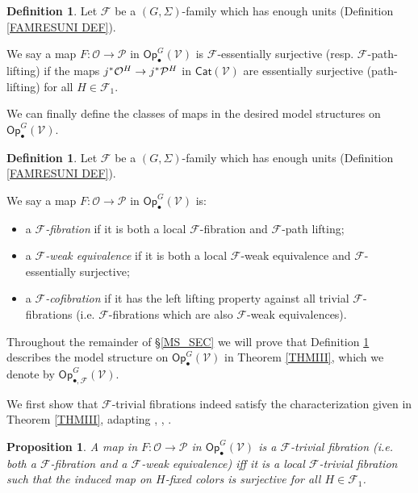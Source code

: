 \documentclass[a4paper,10pt
,draft
]{article}%
\numberwithin{equation}{section}
\numberwithin{figure}{section}
\newtheorem{proposition}[equation]{Proposition}%
\theoremstyle{definition} %
\newtheorem{definition}[equation]{Definition}%
\newcommand{\F}{\ensuremath{\mathcal F}}
\newcommand{\V}{\ensuremath{\mathcal V}}
\renewcommand{\O}{\ensuremath{\mathcal O}}
\renewcommand{\P}{\ensuremath{\mathcal P}}
\newcommand{\1}{\ensuremath{\mathbbm 1}}%
\begin{document}
\begin{definition}\label{FESSENSURJ DEF}
Let $\F$ be a $(G, \Sigma)$-family which has enough units
(Definition \ref{FAMRESUNI DEF}).

We say a map $F: \O \to \P$ in $\mathsf{Op}^G_\bullet(\V)$
is $\F$-essentially surjective (resp. $\F$-path-lifting)
if the maps
$j^{\**}\O^H \to j^{\**} \P^H$
in $\mathsf{Cat}(\V)$ are essentially surjective (path-lifting) for all $H \in \F_1$.
\end{definition}



We can finally define the classes of maps in the desired model structures on $\mathsf{Op}^G_\bullet(\V)$.



\begin{definition}\label{MODEL_DEFN}
Let $\F$ be a $(G, \Sigma)$-family which has enough units
(Definition \ref{FAMRESUNI DEF}).

We say a map $F: \O \to \P$ in $\mathsf{Op}^G_\bullet(\V)$ is:
\begin{itemize}
	\item a {\em $\F$-fibration} if it is both a local $\F$-fibration and $\F$-path lifting;
	\item a {\em $\F$-weak equivalence} if it is both a local $\F$-weak equivalence and $\F$-essentially surjective;
	\item a \textit{$\F$-cofibration} if it has the left lifting property against all trivial $\F$-fibrations (i.e. $\F$-fibrations which are also $\F$-weak equivalences).
\end{itemize}
\end{definition}


Throughout the remainder of \S \ref{MS_SEC}
we will prove that 
Definition \ref{MODEL_DEFN} describes the model structure on 
$\mathsf{Op}^G_\bullet(\V)$
in Theorem \ref{THMIII},
which we denote by
$\mathsf{Op}^G_{\bullet, \F}(\V)$.



We first show that $\F$-trivial fibrations
indeed satisfy the characterization given in Theorem \ref{THMIII},
adapting \cite[4.8]{Cav}, \cite[2.3]{BM13}, \cite[1.18]{CM13b}.

\begin{proposition}\label{FTRIVCHAR PROP}
A map in $F: \O \to \P$ in $\mathsf{Op}^G_\bullet(\V)$ is 
a $\F$-trivial fibration (i.e. both a $\F$-fibration and a $\F$-weak equivalence) 
iff it is a local $\F$-trivial fibration
such that the induced map on $H$-fixed colors is surjective
for all $H \in \F_1$.
\end{proposition}
\end{document}
